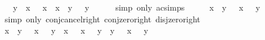 \begin{isabellebody}
\ {\isachardoublequoteopen}{\isasymdots}\ {\isacharequal}{\kern0pt}\ {\isacharparenleft}{\kern0pt}y\ \isactrlbold {\isasymsqinter}\ {\isacharparenleft}{\kern0pt}x\ \isactrlbold {\isasymsqinter}\ \isactrlbold {\isacharminus}{\kern0pt}\ x{\isacharparenright}{\kern0pt}{\isacharparenright}{\kern0pt}\ \isactrlbold {\isasymsqunion}\ {\isacharparenleft}{\kern0pt}x\ \isactrlbold {\isasymsqinter}\ {\isacharparenleft}{\kern0pt}y\ \isactrlbold {\isasymsqinter}\ \isactrlbold {\isacharminus}{\kern0pt}\ y{\isacharparenright}{\kern0pt}{\isacharparenright}{\kern0pt}{\isachardoublequoteclose}\isanewline
\ \ \ \ \isamarkupfalse%
\ {\isacharparenleft}{\kern0pt}simp\ only{\isacharcolon}{\kern0pt}\ ac{\isacharunderscore}{\kern0pt}simps{\isacharparenright}{\kern0pt}\isanewline
\ \ \isamarkupfalse%
\ \isamarkupfalse%
\ {\isachardoublequoteopen}{\isacharparenleft}{\kern0pt}x\ \isactrlbold {\isasymsqinter}\ y{\isacharparenright}{\kern0pt}\ \isactrlbold {\isasymsqinter}\ {\isacharparenleft}{\kern0pt}\isactrlbold {\isacharminus}{\kern0pt}\ x\ \isactrlbold {\isasymsqunion}\ \isactrlbold {\isacharminus}{\kern0pt}\ y{\isacharparenright}{\kern0pt}\ {\isacharequal}{\kern0pt}\ \isanewline
\ \ \ \ \isamarkupfalse%
\ {\isacharparenleft}{\kern0pt}simp\ only{\isacharcolon}{\kern0pt}\ conj{\isacharunderscore}{\kern0pt}cancel{\isacharunderscore}{\kern0pt}right\ conj{\isacharunderscore}{\kern0pt}zero{\isacharunderscore}{\kern0pt}right\ disj{\isacharunderscore}{\kern0pt}zero{\isacharunderscore}{\kern0pt}right{\isacharparenright}{\kern0pt}\isanewline
{}\isamarkupfalse%
\isanewline
\ \ \isamarkupfalse%
\ {\isachardoublequoteopen}{\isacharparenleft}{\kern0pt}x\ \isactrlbold {\isasymsqinter}\ y{\isacharparenright}{\kern0pt}\ \isactrlbold {\isasymsqunion}\ {\isacharparenleft}{\kern0pt}\isactrlbold {\isacharminus}{\kern0pt}\ x\ \isactrlbold {\isasymsqunion}\ \isactrlbold {\isacharminus}{\kern0pt}\ y{\isacharparenright}{\kern0pt}\ {\isacharequal}{\kern0pt}\ {\isacharparenleft}{\kern0pt}x\ \isactrlbold {\isasymsqunion}\ {\isacharparenleft}{\kern0pt}\isactrlbold {\isacharminus}{\kern0pt}\ x\ \isactrlbold {\isasymsqunion}\ \isactrlbold {\isacharminus}{\kern0pt}\ y{\isacharparenright}{\kern0pt}{\isacharparenright}{\kern0pt}\ \isactrlbold {\isasymsqinter}\ {\isacharparenleft}{\kern0pt}y\ \isactrlbold {\isasymsqunion}\ {\isacharparenleft}{\kern0pt}\isactrlbold {\isacharminus}{\kern0pt}\ x\ \isactrlbold {\isasymsqunion}\ \isactrlbold {\isacharminus}{\kern0pt}\ y{\isacharparenright}{\kern0pt}{\isacharparenright}{\kern0pt}{\isachardoublequoteclose}\isanewline

\end{isabellebody}
